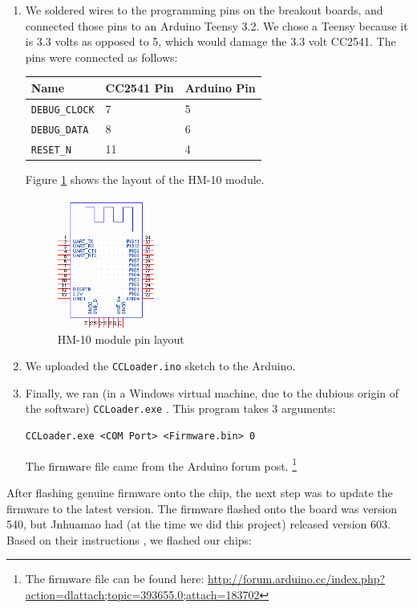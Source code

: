 \documentclass[]{article}
\begin{document}
\begin{enumerate}
\item
  We soldered wires to the programming pins on the breakout boards, and connected those pins to an Arduino Teensy 3.2.
  We chose a Teensy because it is 3.3 volts as opposed to 5, which would damage the 3.3 volt CC2541. The pins were connected as follows:

  \begin{longtable}[]{@{}lll@{}}
  \toprule
  Name & CC2541 Pin & Arduino Pin\tabularnewline
  \midrule
  \endhead
  \texttt{DEBUG\_CLOCK} & 7 & 5\tabularnewline
  \texttt{DEBUG\_DATA} & 8 & 6\tabularnewline
  \texttt{RESET\_N} & 11 & 4\tabularnewline
  \bottomrule
  \end{longtable}

  Figure \ref{fig:hm10} shows the layout of the HM-10 module.
  \begin{figure}
    \centering
    \includegraphics[width=0.3\textwidth]{hm10_pins.png}
    \caption{HM-10 module pin layout \cite{crystal}}
    \label{fig:hm10}
  \end{figure}

\item
  We uploaded the \texttt{CCLoader.ino} \cite{ccloader} sketch to the Arduino.
\item
  Finally, we ran (in a Windows virtual machine, due to the dubious origin of the software) \texttt{CCLoader.exe} \cite{ccloaderexe}.
  This program takes 3 arguments:

  \begin{Verbatim}[gobble=4]
    CCLoader.exe <COM Port> <Firmware.bin> 0
  \end{Verbatim}

  The firmware file came from the Arduino forum post. \footnote{The firmware file can be found here:  \url{http://forum.arduino.cc/index.php?action=dlattach;topic=393655.0;attach=183702}}
\end{enumerate}

After flashing genuine firmware onto the chip, the next step was to update the firmware to the latest version.
The firmware flashed onto the board was version 540, but Jnhuamao had (at the time we did this project) released version 603. \cite{jnhuamao603}
Based on their instructions \cite{jnhuamaoinstructions}, we flashed our chips:
\end{document}
